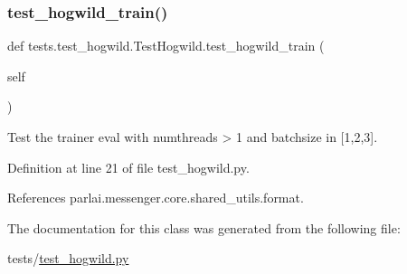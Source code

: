 \subsubsection{\texorpdfstring{test\+\_\+hogwild\+\_\+train()}{test\_hogwild\_train()}}
{\footnotesize\ttfamily def tests.\+test\+\_\+hogwild.\+Test\+Hogwild.\+test\+\_\+hogwild\+\_\+train (\begin{DoxyParamCaption}\item[{}]{self }\end{DoxyParamCaption})}

\begin{DoxyVerb}Test the trainer eval with numthreads > 1 and batchsize in [1,2,3].\end{DoxyVerb}
 

Definition at line 21 of file test\+\_\+hogwild.\+py.



References parlai.\+messenger.\+core.\+shared\+\_\+utils.\+format.



The documentation for this class was generated from the following file\+:\begin{DoxyCompactItemize}
\item 
tests/\hyperlink{test__hogwild_8py}{test\+\_\+hogwild.\+py}\end{DoxyCompactItemize}
